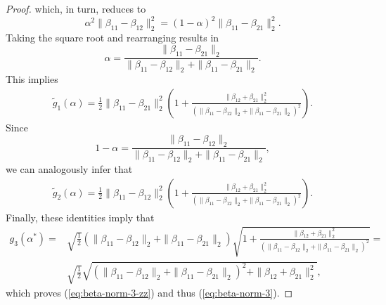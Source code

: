 \documentclass{article}
\theoremstyle{plain}
\theoremstyle{definition}
\theoremstyle{remark}
\begin{document}
\begin{proof}
which, in turn, reduces to
\begin{equation}
    \alpha^2\|\beta_{11}-\beta_{12}\|_2^2=(1-\alpha)^2\|\beta_{11}-\beta_{21}\|_2^2.
\end{equation}
Taking the square root and rearranging results in
\begin{equation}
    \alpha=\frac{\|\beta_{11}-\beta_{21}\|_2}{\|\beta_{11}-\beta_{12}\|_2+\|\beta_{11}-\beta_{21}\|_2}.
\end{equation}
This implies
\begin{align*}
\tilde{g}_1(\alpha)=\tfrac12\|\beta_{11}-\beta_{21}\|_2^2\left(1+\frac{\|\beta_{12}+\beta_{21}\|_2^2}{(\|\beta_{11}-\beta_{12}\|_2+\|\beta_{11}-\beta_{21}\|_2)^2}\right).
\end{align*}
Since
$$
1-\alpha=\frac{\|\beta_{11}-\beta_{12}\|_2}{\|\beta_{11}-\beta_{12}\|_2+\|\beta_{11}-\beta_{21}\|_2},
$$
we can analogously infer that
\begin{align*}
\tilde{g}_2(\alpha)=\tfrac12\|\beta_{11}-\beta_{12}\|_2^2\left(1+\frac{\|\beta_{12}+\beta_{21}\|_2^2}{(\|\beta_{11}-\beta_{12}\|_2+\|\beta_{11}-\beta_{21}\|_2)^2}\right).
\end{align*}
Finally, these identities imply that
\begin{align*}
    g_3(\alpha^{\ast})=
    &\sqrt{\tfrac12}(\|\beta_{11}-\beta_{12}\|_2+\|\beta_{11}-\beta_{21}\|_2)
    \sqrt{1+\frac{\|\beta_{12}+\beta_{21}\|_2^2}{(\|\beta_{11}-\beta_{12}\|_2+\|\beta_{11}-\beta_{21}\|_2)^2}}=\\
    &\sqrt{\tfrac12}\sqrt{(\|\beta_{11}-\beta_{12}\|_2+\|\beta_{11}-\beta_{21}\|_2)^2+\|\beta_{12}+\beta_{21}\|_2^2},
\end{align*}
which proves (\ref{eq:beta-norm-3-zz}) and thus (\ref{eq:beta-norm-3}).


\end{proof}
\end{document}
